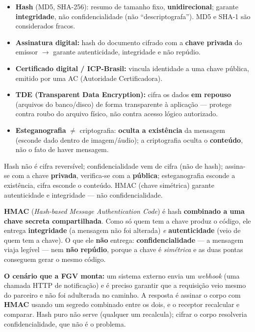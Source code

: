 \begin{itemize}
\item \textbf{Hash} (MD5, SHA-256): resumo de tamanho fixo,
\textbf{unidirecional}; garante \textbf{integridade}, não confidencialidade
(não ``descriptografa''). MD5 e SHA-1 são considerados fracos.
\item \textbf{Assinatura digital:} hash do documento cifrado com a
\textbf{chave privada} do emissor $\to$ garante autenticidade, integridade e
não repúdio.
\item \textbf{Certificado digital / ICP-Brasil:} vincula identidade a uma
chave pública, emitido por uma AC (Autoridade Certificadora).
\item \textbf{TDE (Transparent Data Encryption):} cifra os dados \textbf{em
repouso} (arquivos do banco/disco) de forma transparente à aplicação ---
protege contra roubo do arquivo físico, não contra acesso lógico autorizado.
\item \textbf{Esteganografia} $\neq$ criptografia: \textbf{oculta a
existência} da mensagem (esconde dado dentro de imagem/áudio); a
criptografia oculta o \textbf{conteúdo}, não o fato de haver mensagem.
\end{itemize}

\begin{pegadinha}
Hash não é cifra reversível; confidencialidade vem de cifra (não de hash);
assina-se com a chave \textbf{privada}, verifica-se com a \textbf{pública};
esteganografia esconde a existência, cifra esconde o conteúdo. HMAC (chave
simétrica) garante autenticidade e integridade --- não confidencialidade.
\end{pegadinha}

\begin{conceito}
\textbf{HMAC} (\emph{Hash-based Message Authentication Code}) é hash
\textbf{combinado a uma chave secreta compartilhada}. Como só quem tem a
chave produz o código, ele entrega \textbf{integridade} (a mensagem não foi
alterada) \emph{e} \textbf{autenticidade} (veio de quem tem a chave). O que
ele \textbf{não} entrega: \textbf{confidencialidade} --- a mensagem viaja
legível --- nem \textbf{não repúdio}, porque a chave é \emph{simétrica} e as
duas pontas conseguem gerar o mesmo código.

\textbf{O cenário que a FGV monta:} um sistema externo envia um
\emph{webhook} (uma chamada HTTP de notificação) e é preciso garantir que a
requisição veio mesmo do parceiro e não foi adulterada no caminho. A resposta
é assinar o corpo com \textbf{HMAC} usando um segredo combinado entre os dois,
e o receptor recalcular e comparar. Hash puro não serve (qualquer um
recalcula); cifrar o corpo resolveria confidencialidade, que não é o problema.
\end{conceito}

